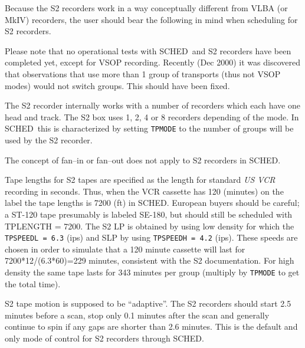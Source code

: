 \documentclass{report}
\newcommand{\sched}{{\sc SCHED}}
\newcommand{\schedb}{{\sc SCHED~}}
\begin{document}

Because the S2 recorders work in a way conceptually different from
VLBA (or MkIV) recorders, the user should bear the following in mind
when scheduling for S2 recorders.

Please note that no operational tests with \schedb and S2 recorders
have been completed yet, except for VSOP recording. Recently (Dec 2000)
it was discovered that observations that use more than 1 group of
transports (thus not VSOP modes) would not switch groups. This should
have been fixed.

\begin{list}{}{\parsep 0em  \itemsep 0em }

\item The S2 recorder internally works with a number of recorders
  which each have one head and track. The S2 box uses 1, 2, 4 or 8
  recorders depending of the mode. In \schedb this is characterized by
  setting {\tt TPMODE} to the number of groups will be used by the S2
  recorder.

\item The concept of fan--in or fan--out does not apply to S2 recorders
  in \sched.

\item Tape lengths for S2 tapes are specified as the length for
  standard {\sl US VCR} recording in seconds. Thus, when the VCR
  cassette has 120 (minutes) on the label the tape lengths is 7200
  (ft) in \sched.  European buyers should be careful; a ST-120 tape
  presumably is labeled SE-180, but should still be scheduled with
  TPLENGTH = 7200.  The S2 LP is obtained by using low density for
  which the {\tt TPSPEEDL = 6.3} (ips) and SLP by using {\tt TPSPEEDH
   = 4.2} (ips).  These speeds are chosen in order to simulate that a
  120 minute cassette will last for 7200*12/(6.3*60)=229
  minutes, consistent with the S2 documentation. For high
   density the same tape lasts for 343 minutes per group (multiply by
  {\tt TPMODE} to get the total time).


\item S2 tape motion is supposed to be ``adaptive''. The S2 recorders
  should start 2.5 minutes before a scan, stop only 0.1 minutes after
  the scan and generally continue to spin if any gaps are shorter than
  2.6 minutes. This is the default and only mode of control for S2
  recorders through \sched.

\end{list}
\end{document}
